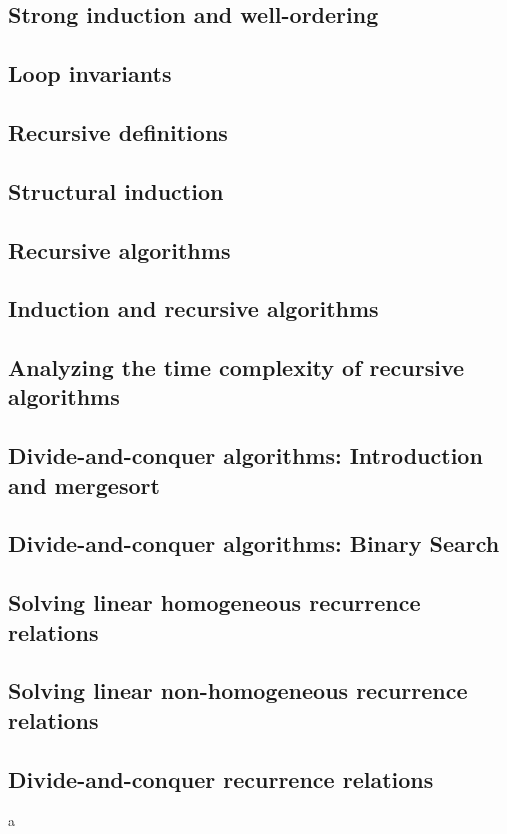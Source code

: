 \documentclass{article}
\begin{document}
\subsection{Strong induction and well-ordering}
\subsection{Loop invariants}
\subsection{Recursive definitions}
\subsection{Structural induction}
\subsection{Recursive algorithms}
\subsection{Induction and recursive algorithms}
\subsection{Analyzing the time complexity of recursive algorithms}
\subsection{Divide-and-conquer algorithms: Introduction and mergesort}
\subsection{Divide-and-conquer algorithms: Binary Search}
\subsection{Solving linear homogeneous recurrence relations}
\subsection{Solving linear non-homogeneous recurrence relations}
\subsection{Divide-and-conquer recurrence relations}

a
\end{document}

